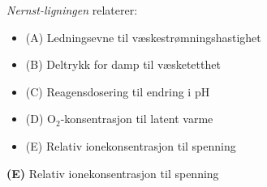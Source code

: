 

{\it Nernst-ligningen} relaterer:

\begin{itemize}
\item{(A)} Ledningsevne til væskestrømningshastighet
\vskip 5pt 
\item{(B)} Deltrykk for damp til væsketetthet
\vskip 5pt 
\item{(C)} Reagensdosering til endring i pH
\vskip 5pt 
\item{(D)} O$_{2}$-konsentrasjon til latent varme
\vskip 5pt 
\item{(E)} Relativ ionekonsentrasjon til spenning
\end{itemize}







{\bf (E)} Relativ ionekonsentrasjon til spenning 
 







